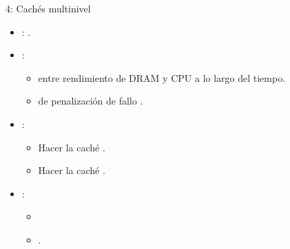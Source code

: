 \begin{frame}[t]{4: Cachés multinivel}
\begin{itemize}
  \item {}: .

  \item {}:
    \begin{itemize} 
      \item {} entre rendimiento de DRAM y CPU a lo largo del tiempo.
      \item {} de penalización de fallo .
    \end{itemize}

  \item {}:
    \begin{itemize} 
      \item Hacer la caché .
      \item Hacer la caché .
    \end{itemize}

  \item {}:
    \begin{itemize}
      \item {}
      \item {}.
    \end{itemize}
\end{itemize}
\end{frame}

